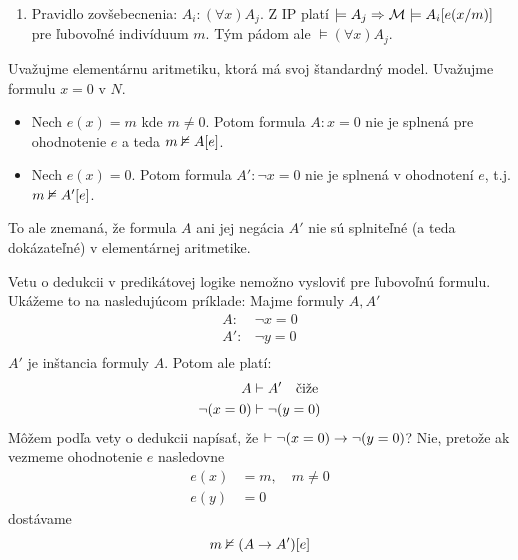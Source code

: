 \begin{dokaz}
\begin{enumerate}
\begin{enumerate}
        \item Pravidlo zovšebecnenia: $A_i: (\forall x) A_j$.
            Z IP platí $\models A_j \Rightarrow
                \mathcal{M} \models A_i[e(x/m)]$
            pre ľubovoľné indivíduum $m$. Tým pádom ale
            $\models (\forall x) A_j$.
            
        \end{enumerate}
    \end{enumerate}
\end{dokaz}


\begin{priklad} %
    Uvažujme elementárnu aritmetiku, ktorá má svoj štandardný
    model. Uvažujme formulu $x=0$ v $N$.
    \begin{itemize}
        \item Nech $e(x) = m$ kde $m \neq 0$. Potom formula $A:x=0$ nie je
        splnená pre ohodnotenie $e$ a teda $m \nvDash A[e]$.
        \item Nech $e(x) = 0$. Potom formula $A': \neg x=0$ nie je
        splnená v ohodnotení $e$, t.j. $m \nvDash A'[e]$.
    \end{itemize}
    To ale znemaná, že formula $A$ ani jej negácia $A'$
    nie sú splniteľné (a teda dokázateľné) v elementárnej aritmetike.
\end{priklad}


\begin{poznamka} %
    Vetu o dedukcii v predikátovej logike nemožno vysloviť pre
    ľubovoľnú formulu. Ukážeme to na nasledujúcom príklade: Majme
    formuly $A,A'$
    \begin{align*}
            A: & \neg x=0 \\
            A': & \neg y=0 \\
    \end{align*}
    $A'$ je inštancia formuly $A$. Potom ale platí:
    \begin{align*}
            A &\vdash A'  \quad \mbox{čiže}\\
            \neg (x=0) &\vdash \neg (y=0)
    \end{align*}
    Môžem podľa vety o dedukcii napísať, že 
    $\vdash \neg (x=0) \rightarrow \neg (y=0)$? Nie, pretože ak
    vezmeme ohodnotenie $e$ nasledovne
    \begin{align*}
        e(x) &= m, \quad m \neq 0 \\
        e(y) &= 0
    \end{align*}
    dostávame
    \begin{equation*}
        m \nvDash (A \rightarrow A')[e]
    \end{equation*}
\end{poznamka}

